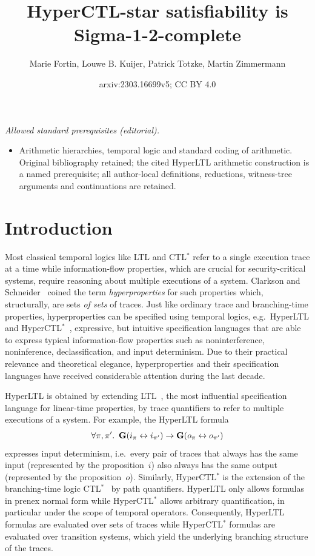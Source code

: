 \documentclass[dvipsnames,10pt,a4paper]{amsart}
\title{HyperCTL-star satisfiability is Sigma-1-2-complete}
\author{Marie Fortin, Louwe B. Kuijer, Patrick Totzke, Martin Zimmermann}
\date{arxiv:2303.16699v5; CC BY 4.0}
\theoremstyle{definition}
\theoremstyle{remark}
\newcommand{\G}{\mathop{\mathbf{G}\vphantom{a}}\nolimits}
\newcommand{\ltl}{{LTL}\xspace}
\newcommand{\ctlstar}{{CTL$^*$}\xspace}
\newcommand{\hyltl}{{HyperLTL}\xspace}
\newcommand{\hyctlstar}{{HyperCTL$^*$}\xspace}
\begin{document}
\maketitle
\noindent\textit{Allowed standard prerequisites (editorial).}\begin{itemize}
\item Arithmetic hierarchies, temporal logic and standard coding of arithmetic. Original bibliography retained; the cited HyperLTL arithmetic construction is a named prerequisite; all author-local definitions, reductions, witness-tree arguments and continuations are retained.
\end{itemize}\medskip
\section{Introduction}
\label{sec:intro}

Most classical temporal logics like \ltl and \ctlstar refer to a single execution trace at a time while information-flow properties, which are crucial for security-critical systems,
require reasoning about multiple executions of a system. 
Clarkson and Schneider~\cite{ClarksonS10} coined the term \emph{hyperproperties} for such properties which, structurally, are sets \emph{of sets} of traces.
Just like ordinary trace and branching-time properties, hyperproperties can be specified using temporal logics, e.g.\ \hyltl and \hyctlstar~\cite{ClarksonFKMRS14}, expressive, but intuitive specification languages that are able to express typical information-flow properties such as noninterference, noninference, declassification, and input determinism.
Due to their practical relevance and theoretical elegance, hyperproperties and their specification languages have received considerable attention during the last decade.

\hyltl is obtained by extending \ltl~\cite{Pnueli77}, the most influential specification language for linear-time properties, by trace quantifiers to refer to multiple executions of a system. 
For example, the \hyltl formula
\[\forall \pi, \pi'.\ \G( i_\pi \leftrightarrow i_{\pi'}) \rightarrow \G (o_\pi \leftrightarrow o_{\pi'}) \]
expresses input determinism, i.e.\ every pair of traces that always has the same input (represented by the proposition~$i$) also always has the same output (represented by the proposition~$o$). 
Similarly, \hyctlstar is the extension of the branching-time logic \ctlstar~\cite{EmersonH86} by path quantifiers. 
\hyltl only allows formulas in prenex normal form while \hyctlstar allows arbitrary quantification, in particular under the scope of temporal operators. 
Consequently, \hyltl formulas are evaluated over sets of traces while \hyctlstar formulas are evaluated over transition systems, which yield the underlying branching structure of the traces. 
\end{document}
